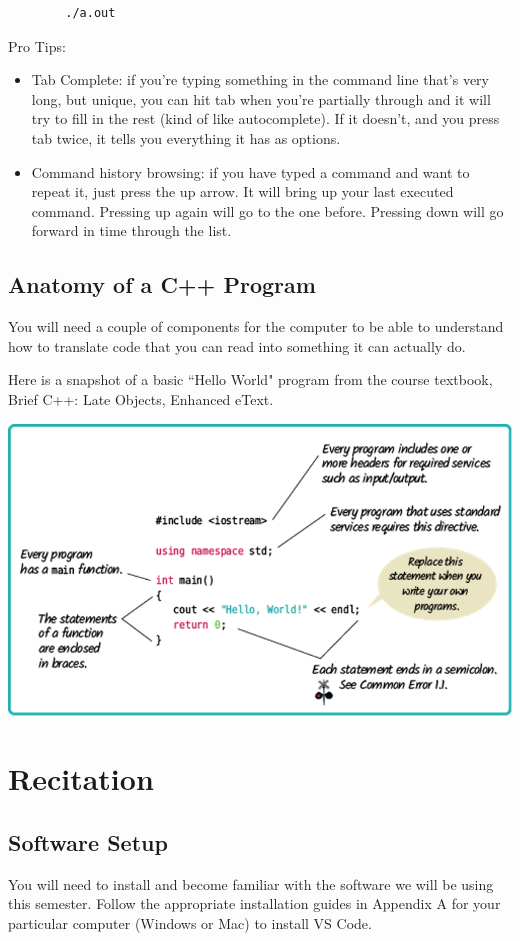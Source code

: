 \begin{verbatim}
        ./a.out
\end{verbatim}

Pro Tips:
\begin{itemize}
    \item Tab Complete: if you're typing something in the command line that’s very long, but unique, you can hit tab when you're partially through and it will try to fill in the rest (kind of like autocomplete). If it doesn't, and you press tab twice, it tells you everything it has as options.
    \item Command history browsing: if you have typed a command and want to repeat it, just press the up arrow. It will bring up your last executed command. Pressing up again will go to the one before. Pressing down will go forward in time through the list.
\end{itemize}

\subsection{Anatomy of a C++ Program}

You will need a couple of components for the computer to be able to understand how to translate code that you can read into something it can actually do. 

Here is a snapshot of a basic ``Hello World" program from the course textbook,  Brief C++: Late Objects, Enhanced eText. 

\includegraphics[width=\textwidth]{images/hello_world_16.png}

\section{Recitation}
\subsection{Software Setup}
You will need to install and become familiar with the software we will be using this semester. Follow the appropriate installation guides in Appendix A for your particular computer (Windows or Mac) to install VS Code. 

